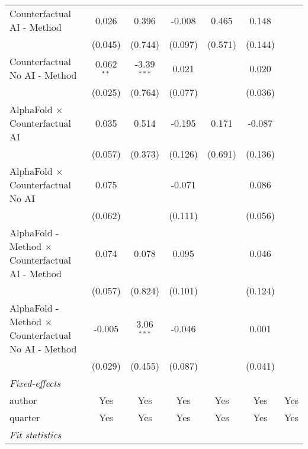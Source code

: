 \begin{tabular}{lcccccc}
   Counterfactual AI - Method                                 & 0.026        & 0.396         & -0.008  & 0.465   & 0.148       &   \\   
                                                              & (0.045)      & (0.744)       & (0.097) & (0.571) & (0.144)     &   \\   
   Counterfactual No AI - Method                              & 0.062$^{**}$ & -3.39$^{***}$ & 0.021   &         & 0.020       &   \\   
                                                              & (0.025)      & (0.764)       & (0.077) &         & (0.036)     &   \\   
   AlphaFold $\times$ Counterfactual AI                       & 0.035        & 0.514         & -0.195  & 0.171   & -0.087      &   \\   
                                                              & (0.057)      & (0.373)       & (0.126) & (0.691) & (0.136)     &   \\   
   AlphaFold $\times$ Counterfactual No AI                    & 0.075        &               & -0.071  &         & 0.086       &   \\   
                                                              & (0.062)      &               & (0.111) &         & (0.056)     &   \\   
   AlphaFold - Method $\times$ Counterfactual AI - Method     & 0.074        & 0.078         & 0.095   &         & 0.046       &   \\   
                                                              & (0.057)      & (0.824)       & (0.101) &         & (0.124)     &   \\   
   AlphaFold - Method $\times$ Counterfactual No AI - Method  & -0.005       & 3.06$^{***}$  & -0.046  &         & 0.001       &   \\   
                                                              & (0.029)      & (0.455)       & (0.087) &         & (0.041)     &   \\   
   \midrule
   \emph{Fixed-effects}\\
   author                                                     & Yes          & Yes           & Yes     & Yes     & Yes         & Yes\\  
   quarter                                                    & Yes          & Yes           & Yes     & Yes     & Yes         & Yes\\  
   \midrule
   \emph{Fit statistics}\\

\end{tabular}
